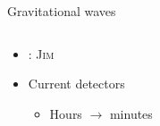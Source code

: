 \documentclass[usenames,dvipsnames,t]{beamer}
\newcommand{\ghlink}[1]{\href{https://github.com/#1}{\textcolor{black}{\faGithub}}}
\begin{document}
\begin{frame}{Gravitational waves}
  \begin{columns}
    \begin{column}[t]{0.60\linewidth}
      \begin{itemize}
        \item {}: \textsc{Jim}~\ghlink{kazewong/jim}~\cite{Wong:2023lgb,Wouters:2024oxj}
    
        \vspace{\x}
    
        \item \green{\checkmark} Current detectors
        \begin{itemize}
          \item Hours $\rightarrow$ minutes
        \end{itemize}
    
        \vspace{\x}

      \end{itemize}
    \end{column}


\end{columns}
\end{frame}
\end{document}
